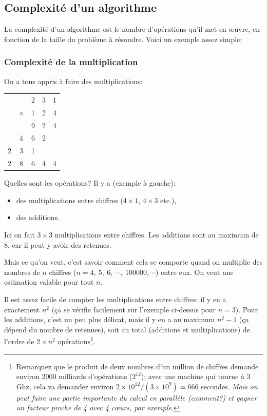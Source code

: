 \subsection{Complexité d'un algorithme}
La complexité d'un algorithme est le nombre d'opérations qu'il met en
{\oe}uvre, en fonction de la taille du problème à résoudre. Voici un
exemple assez simple:

\subsubsection{Complexité de la multiplication} On a tous appris à faire
des multiplications:

\begin{boxedminipage}{0.3\textwidth}
\begin{tabular}{ccccc}
        &&2&3&1\\
        &$\times$&1&2&4\\
        \hline
        &&9&2&4\\
        &4&6&2\\
        2&3&1\\
        \hline
        2&8&6&4&4\\
\end{tabular}
\end{boxedminipage}
\hspace*{0.02\textwidth}
\begin{minipage}{0.6\textwidth}
  Quelles sont les opérations? Il y a (exemple à gauche):
  \begin{itemize}
    \item des multiplications entre
      chiffres ($4 \times 1$, $4 \times 3$ etc.),
    \item des additions.
  \end{itemize}
      Ici
  on fait $3 \times 3$ multiplications entre
  chiffres. Les additions 
  sont  au maximum de $8$, car il peut y avoir des retenues.
\end{minipage}


Mais ce qu'on veut, c'est savoir comment cela se comporte quand on
multiplie des nombres de $n$ chiffres ($n=4,\ 5,\ 6,\, \cdots,
\ 100000, \cdots$) entre eux. On veut une estimation valable pour tout $n$.

Il est assez facile de compter les multiplications entre chiffres: il
y en a exactement $n^2$ (ça se vérifie facilement sur l'exemple
ci-dessus pour $n=3$).
Pour les additions, c'est un peu plus délicat, mais il y en a au
maximum $n^2 -1$ (ça dépend du nombre de retenues), soit au total
(additions et multiplications) de l'ordre de  $2 \times n^2$
opérations\footnote{ 
Remarquez que le
produit de deux nombres d'un million de chiffres demande environ 2000
milliards d'opérations ($2^{12}$); avec une machine qui tourne à 3 Ghz, cela va
demander environ $2 \times 10^{12}/(3\times 10^9)\simeq 666$ secondes.
\emph{Mais on peut faire une partie importante du calcul en parallèle
  (comment?) et gagner un facteur proche de 4 avec 4 c{\oe}urs, par exemple.}
}.

